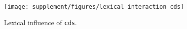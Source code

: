 \begin{figure}[h]
  \centering

  \texttt{[image: supplement/figures/lexical-interaction-cds]}

  \caption{Lexical influence of \texttt{cds}.}
  \label{fig:lexical-cds}
\end{figure}
